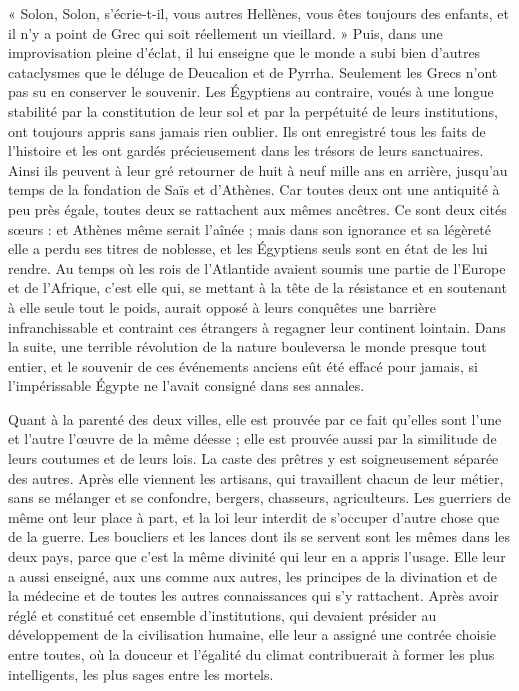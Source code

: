 \documentclass[letterpaper,twocolumn,openany,nodeprecatedcode]{dndbook}
\begin{document}
« Solon, Solon, s'écrie-t-il, vous autres Hellènes, vous êtes toujours des enfants, et il n'y a point de Grec qui soit réellement un vieillard. » Puis, dans une improvisation pleine d'éclat, il lui enseigne que le monde a subi bien d'autres cataclysmes que le déluge de Deucalion et de Pyrrha. Seulement les Grecs n'ont pas su en conserver le souvenir. Les Égyptiens au contraire, voués à une longue stabilité par la constitution de leur sol et par la perpétuité de leurs institutions, ont toujours appris sans jamais rien oublier. Ils ont enregistré tous les faits de l'histoire et les ont gardés précieusement dans les trésors de leurs sanctuaires. Ainsi ils peuvent à leur gré retourner de huit à neuf mille ans en arrière, jusqu'au temps de la fondation de Saïs et d'Athènes. Car toutes deux ont une antiquité à peu près égale, toutes deux se rattachent aux mêmes ancêtres. Ce sont deux cités sœurs : et Athènes même serait l'aînée ; mais dans son ignorance et sa légèreté elle a perdu ses titres de noblesse, et les Égyptiens seuls sont en état de les lui rendre. Au temps où les rois de l'Atlantide avaient soumis une partie de l'Europe et de l'Afrique, c'est elle qui, se mettant à la tête de la résistance et en soutenant à elle seule tout le poids, aurait opposé à leurs conquêtes une barrière infranchissable et contraint ces étrangers à regagner leur continent lointain. Dans la suite, une terrible révolution de la nature bouleversa le monde presque tout entier, et le souvenir de ces événements anciens eût été effacé pour jamais, si l'impérissable Égypte ne l'avait consigné dans ses annales.

Quant à la parenté des deux villes, elle est prouvée par ce fait qu'elles sont l'une et l'autre l'œuvre de la même déesse ; elle est prouvée aussi par la similitude de leurs coutumes et de leurs lois. La caste des prêtres y est soigneusement séparée des autres. Après elle viennent les artisans, qui travaillent chacun de leur métier, sans se mélanger et se confondre, bergers, chasseurs, agriculteurs. Les guerriers de même ont leur place à part, et la loi leur interdit de s'occuper d'autre chose que de la guerre. Les boucliers et les lances dont ils se servent sont les mêmes dans les deux pays, parce que c'est la même divinité qui leur en a appris l'usage. Elle leur a aussi enseigné, aux uns comme aux autres, les principes de la divination et de la médecine et de toutes les autres connaissances qui s'y rattachent. Après avoir réglé et constitué cet ensemble d'institutions, qui devaient présider au développement de la civilisation humaine, elle leur a assigné une contrée choisie entre toutes, où la douceur et l'égalité du climat contribuerait à former les plus intelligents, les plus sages entre les mortels.
\end{document}
